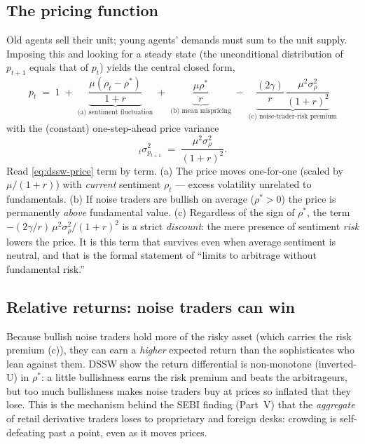 \subsection*{The pricing function}
Old agents sell their unit; young agents' demands must sum to the unit supply. Imposing this and looking for a steady state (the unconditional distribution of $p_{t+1}$ equals that of $p_t$) yields the central closed form,
\begin{equation}
\boxed{\;p_t \;=\; 1 \;+\; \underbrace{\frac{\mu(\rho_t-\rho^\ast)}{1+r}}_{\text{(a) sentiment fluctuation}} \;+\; \underbrace{\frac{\mu\rho^\ast}{r}}_{\text{(b) mean mispricing}} \;-\; \underbrace{\frac{(2\gamma)}{r}\,\frac{\mu^2\sigma_\rho^2}{(1+r)^2}}_{\text{(c) noise-trader-risk premium}}\;}
\label{eq:dssw-price}
\end{equation}
with the (constant) one-step-ahead price variance
\begin{equation}
{}_t\sigma^2_{p_{t+1}} \;=\; \frac{\mu^2\sigma_\rho^2}{(1+r)^2}. \label{eq:dssw-var}
\end{equation}
Read \eqref{eq:dssw-price} term by term. (a) The price moves one-for-one (scaled by $\mu/(1+r)$) with \emph{current} sentiment $\rho_t$ --- excess volatility unrelated to fundamentals. (b) If noise traders are bullish on average ($\rho^\ast>0$) the price is permanently \emph{above} fundamental value. (c) Regardless of the sign of $\rho^\ast$, the term $-(2\gamma/r)\,\mu^2\sigma_\rho^2/(1+r)^2$ is a strict \emph{discount}: the mere presence of sentiment \emph{risk} lowers the price. It is this term that survives even when average sentiment is neutral, and that is the formal statement of ``limits to arbitrage without fundamental risk.''

\subsection*{Relative returns: noise traders can win}
Because bullish noise traders hold more of the risky asset (which carries the risk premium (c)), they can earn a \emph{higher} expected return than the sophisticates who lean against them. DSSW show the return differential is non-monotone (inverted-U) in $\rho^\ast$: a little bullishness earns the risk premium and beats the arbitrageurs, but too much bullishness makes noise traders buy at prices so inflated that they lose. This is the mechanism behind the SEBI finding (Part~V) that the \emph{aggregate} of retail derivative traders loses to proprietary and foreign desks: crowding is self-defeating past a point, even as it moves prices.

